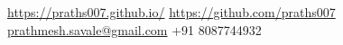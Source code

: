 \documentclass[10pt,a4paper]{article}
\begin{document}
\sloppy  %



\nobreakvspace{0.3em}  %

\noindent
\small{
\href{https://praths007.github.io/}{https://praths007.github.io/}\sbull
\href{https://github.com/praths007}{https://github.com/praths007}\sbull
\href{mailto:prathmesh.savale@gmail.com}{prathmesh.savale@gmail.com}\sbull
+91 8087744932 }


\spacedhrule{0.9em}{-0.4em}  %

%
%
%
%
%
\end{document}
